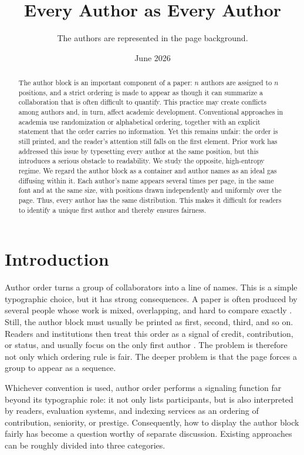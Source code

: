 \documentclass[10pt,letterpaper]{article}
\title{Every Author as Every Author}
\author{The authors are represented in the page background.}
\date{June 2026}
\theoremstyle{definition}
\theoremstyle{remark}
\begin{document}
\maketitle

\begin{abstract}
The author block is an important component of a paper: $n$ authors are assigned to $n$ positions, and a strict ordering is made to appear as though it can summarize a collaboration that is often difficult to quantify. This practice may create conflicts among authors and, in turn, affect academic development. Conventional approaches in academia use randomization or alphabetical ordering, together with an explicit statement that the order carries no information. Yet this remains unfair: the order is still printed, and the reader's attention still falls on the first element. Prior work has addressed this issue by typesetting every author at the same position, but this introduces a serious obstacle to readability. We study the opposite, high-entropy regime. We regard the author block as a container and author names as an ideal gas diffusing within it. Each author's name appears several times per page, in the same font and at the same size, with positions drawn independently and uniformly over the page. Thus, every author has the same distribution. This makes it difficult for readers to identify a unique first author and thereby ensures fairness.

\end{abstract}

\section{Introduction}

Author order turns a group of collaborators into a line of names. This is a simple typographic choice, but it has strong consequences. A paper is often produced by several people whose work is mixed, overlapping, and hard to compare exactly \cite{tscharntke2007author}. Still, the author block must usually be printed as first, second, third, and so on. Readers and institutions then treat this order as a signal of credit, contribution, or status, and usually focus on the only first author \cite{cormode2013first}. The problem is therefore not only which ordering rule is fair. The deeper problem is that the page forces a group to appear as a sequence.


Whichever convention is used, author order performs a signaling function far beyond its typographic role: it not only lists participants, but is also interpreted by readers, evaluation systems, and indexing services as an ordering of contribution, seniority, or prestige. Consequently, how to display the author block fairly has become a question worthy of separate discussion. Existing approaches can be roughly divided into three categories.
\end{document}
